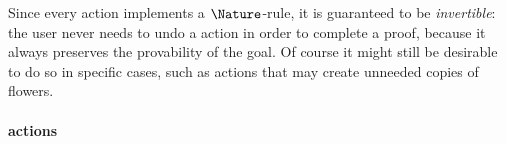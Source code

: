 Since every \Proof action implements a $\Nature$-rule, it is guaranteed to be
\emph{invertible}: the user never needs to undo a \Proof action in order to
complete a proof, because it always preserves the provability of the goal. Of
course it might still be desirable to do so in specific cases, such as
 actions that may create unneeded copies of flowers.

\paragraph{\Edit actions}


